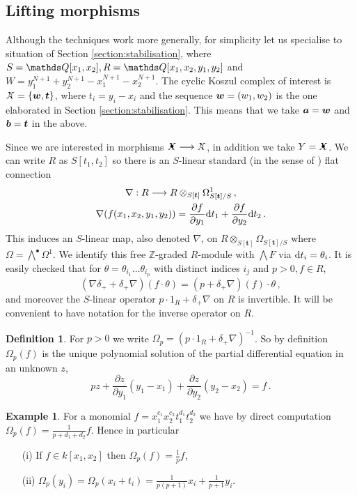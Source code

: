 \documentclass{compositio}
\theoremstyle{definition}
\newtheorem{definition}[theorem]{Definition}
\newtheorem{example}[theorem]{Example}
\numberwithin{equation}{section}
\begin{document}
\subsection{Lifting morphisms}\label{subsection:liftingmorphisms}

Although the techniques work more generally, for simplicity let us specialise to situation of Section \ref{section:stabilisation}, where $S = \QQ[x_1, x_2], R = \QQ[x_1,x_2,y_1,y_2]$ and $W = y_1^{N+1} + y_2^{N+1} - x_1^{N+1} - x_2^{N+1}$. The cyclic Koszul complex of interest is $\Xcirc = \{ \bs{w}, \bs{t} \}$, where $t_i = y_i - x_i$ and the sequence $\boldsymbol{w} = (w_1,w_2)$ is the one elaborated in Section \ref{section:stabilisation}. This means that we take $\boldsymbol{a}=\boldsymbol{w}$ and $\boldsymbol{b} = \boldsymbol{t}$ in the above. 

Since we are interested in morphisms $\Xbul \lto \Xcirc$, in addition we take $Y = \Xbul$. We can write $R$ as $S[t_1,t_2]$ so there is an $S$-linear standard (in the sense of \cite[Section 8.1]{dm1102.2957}) flat connection
\begin{gather*}
\nabla: R \longrightarrow R \otimes_{S[\boldsymbol{t}]} \Omega^1_{S[\boldsymbol{t}]/S} \, ,\\
\nabla( f(x_1,x_2,y_1,y_2) ) = \frac{\partial f}{\partial y_1} \mathrm{d} t_1 + \frac{\partial f}{\partial y_2} \mathrm{d} t_2 \, .
\end{gather*}
This induces an $S$-linear map, also denoted $\nabla$, on $R \otimes_{S[\boldsymbol{t}]} \Omega_{S[\boldsymbol{t}]/S}$ where $\Omega = \bigwedge^\bullet \Omega^1$. We identify this free $\mathds{Z}$-graded $R$-module with $\bigwedge F$ via $\mathrm{d} t_i = \theta_i$. It is easily checked that for $\theta = \theta_{i_1} \ldots \theta_{i_p}$ with distinct indices $i_j$ and $p > 0, f \in R$,
\[
(\nabla \delta_+ + \delta_+ \nabla)(f \cdot \theta) = (p + \delta_{+}\nabla)(f) \cdot \theta \, ,
\]
and moreover the $S$-linear operator $p \cdot 1_R + \delta_{+} \nabla$ on $R$ is invertible. It will be convenient to have notation for the inverse operator on $R$.

\begin{definition}\label{defn:omega} For $p > 0$ we write $\Omega_p = (p \cdot 1_R + \delta_{+} \nabla)^{-1}$. So by definition $\Omega_p(f)$ is the unique polynomial solution of the partial differential equation in an unknown $z$,
\[
p z + \frac{\partial z}{\partial y_1} (y_1 - x_1) + \frac{\partial z}{\partial y_2}(y_2 - x_2) = f \, .
\]
\end{definition}

\begin{example}\label{example:compomega} For a monomial $f = x_1^{c_1} x_2^{c_2} t_1^{d_1} t_2^{d_2}$ we have by direct computation $\Omega_p(f) = \frac{1}{p + d_1 + d_2} f$. Hence in particular
\begin{itemize}
\item[(i)] If $f \in k[x_1,x_2]$ then $\Omega_p(f) = \frac{1}{p} f$,
\item[(ii)] $\Omega_p(y_i) = \Omega_p(x_i + t_i) = \frac{1}{p(p+1)} x_i + \frac{1}{p+1} y_i$.
\end{itemize}
\end{example}
\end{document}
